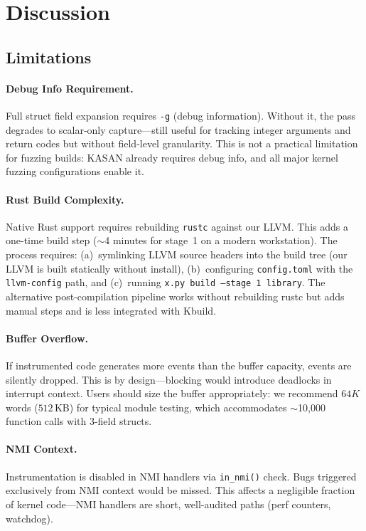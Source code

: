 \documentclass{ndss}
\begin{document}
\section{Discussion}\label{sec:discussion}

\subsection{Limitations}

\paragraph{Debug Info Requirement.} Full struct field expansion requires
\texttt{-g} (debug information). Without it, the pass degrades to scalar-only
capture---still useful for tracking integer arguments and return codes but
without field-level granularity. This is not a practical limitation for fuzzing
builds: KASAN already requires debug info, and all major kernel fuzzing
configurations enable it.

\paragraph{Rust Build Complexity.} Native Rust support requires rebuilding
\texttt{rustc} against our LLVM. This adds a one-time build step ($\sim$4
minutes for stage~1 on a modern workstation). The process requires:
(a)~symlinking LLVM source headers into the build tree (our LLVM is built
statically without install), (b)~configuring \texttt{config.toml} with the
\texttt{llvm-config} path, and (c)~running \texttt{x.py build --stage 1
library}. The alternative post-compilation pipeline works without rebuilding
rustc but adds manual steps and is less integrated with Kbuild.

\paragraph{Buffer Overflow.} If instrumented code generates more events than
the buffer capacity, events are silently dropped. This is by design---blocking
would introduce deadlocks in interrupt context. Users should size the buffer
appropriately: we recommend $64K$ words ($512$\,KB) for typical module testing,
which accommodates $\sim$10{,}000 function calls with 3-field structs.

\paragraph{NMI Context.} Instrumentation is disabled in NMI handlers via
\texttt{in\_nmi()} check. Bugs triggered exclusively from NMI context would be
missed. This affects a negligible fraction of kernel code---NMI handlers are
short, well-audited paths (perf counters, watchdog).
\end{document}
